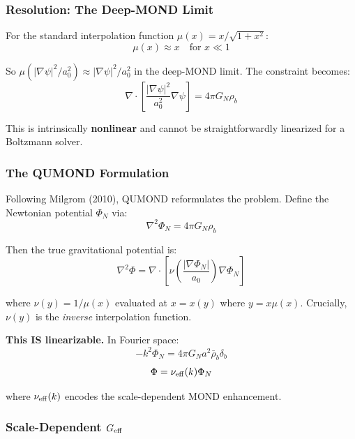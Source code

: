 \documentclass[11pt,a4paper]{article}
\begin{document}
\subsubsection{Resolution: The Deep-MOND Limit}

For the standard interpolation function $\mu(x) = x/\sqrt{1+x^2}$:
\begin{equation}
\mu(x) \approx x \quad \text{for } x \ll 1
\end{equation}

So $\mu(|\nabla\psi|^2/a_0^2) \approx |\nabla\psi|^2/a_0^2$ in the deep-MOND limit. The constraint becomes:
\begin{equation}
\nabla\cdot\left[\frac{|\nabla\psi|^2}{a_0^2}\nabla\psi\right] = 4\pi G_N\rho_b
\end{equation}

This is intrinsically \textbf{nonlinear} and cannot be straightforwardly linearized for a Boltzmann solver.

\subsubsection{The QUMOND Formulation}

Following Milgrom (2010), QUMOND reformulates the problem. Define the Newtonian potential $\Phi_N$ via:
\begin{equation}
\nabla^2\Phi_N = 4\pi G_N\rho_b
\end{equation}

Then the true gravitational potential is:
\begin{equation}
\nabla^2\Phi = \nabla\cdot\left[\nu\!\left(\frac{|\nabla\Phi_N|}{a_0}\right)\nabla\Phi_N\right]
\end{equation}

where $\nu(y) = 1/\mu(x)$ evaluated at $x = x(y)$ where $y = x\mu(x)$. Crucially, $\nu(y)$ is the \emph{inverse} interpolation function.

\textbf{This IS linearizable.} In Fourier space:
\begin{equation}
-k^2\Phi_N = 4\pi G_N a^2\bar{\rho}_b\delta_b
\end{equation}
\begin{equation}
\Phi = \nu_{\rm eff}(k)\Phi_N
\end{equation}

where $\nu_{\rm eff}(k)$ encodes the scale-dependent MOND enhancement.

\subsubsection{Scale-Dependent $G_{\rm eff}$}
\end{document}
